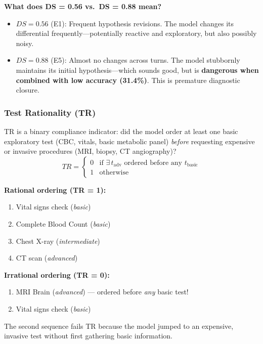\textbf{What does DS = 0.56 vs.\ DS = 0.88 mean?}
\begin{itemize}
    \item $DS = 0.56$ (E1): Frequent hypothesis revisions. The model changes its differential frequently---potentially reactive and exploratory, but also possibly noisy.
    \item $DS = 0.88$ (E5): Almost no changes across turns. The model stubbornly maintains its initial hypothesis---which sounds good, but is \textbf{dangerous when combined with low accuracy (31.4\%)}. This is premature diagnostic closure.
\end{itemize}

\subsubsection{Test Rationality (TR)}

\begin{acadbox}[\textcolor{white}{Academic Definition}]
TR is a binary compliance indicator: did the model order at least one basic exploratory test (CBC, vitals, basic metabolic panel) \textit{before} requesting expensive or invasive procedures (MRI, biopsy, CT angiography)?
\[
TR = \begin{cases}
0 & \text{if } \exists\, t_{\text{adv}} \text{ ordered before any } t_{\text{basic}} \\
1 & \text{otherwise}
\end{cases}
\]
\end{acadbox}

\begin{examplebox}[\textcolor{white}{Worked Example: Test Ordering for TR}]
\textbf{Rational ordering (TR = 1):}
\begin{enumerate}
    \item Vital signs check (\textit{basic})
    \item Complete Blood Count (\textit{basic})
    \item Chest X-ray (\textit{intermediate})
    \item CT scan (\textit{advanced})
\end{enumerate}

\textbf{Irrational ordering (TR = 0):}
\begin{enumerate}
    \item MRI Brain (\textit{advanced}) --- ordered before \textit{any} basic test!
    \item Vital signs check (\textit{basic})
\end{enumerate}
The second sequence fails TR because the model jumped to an expensive, invasive test without first gathering basic information.
\end{examplebox}

